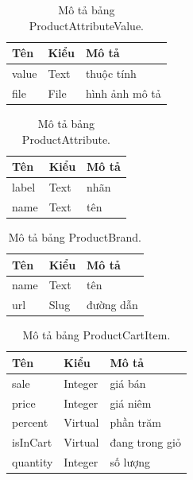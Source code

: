 \documentclass[11pt]{report}
\begin{document}
	
	\begin{table}[h!]
		\begin{center}
			\caption{Mô tả bảng ProductAttributeValue.}
			\begin{tabular}{ |l|l|l| } 
				\hline
				Tên & Kiểu & Mô tả \\
				\hline
				value & Text & thuộc tính \\
				file & File & hình ảnh mô tả \\ 
				\hline
			\end{tabular}
			\label{table:ProductAttributeValue}
		\end{center}
	\end{table}
	
	
	\begin{table}[h!]
		\begin{center}
			\caption{Mô tả bảng ProductAttribute.}
			\begin{tabular}{ |l|l|l| } 
				\hline
				Tên & Kiểu & Mô tả \\
				\hline
				label & Text & nhãn \\
				name & Text & tên \\
				\hline
			\end{tabular}
			\label{table:ProductAttribute}
		\end{center}
	\end{table}
	
	
	\begin{table}[h!]
		\begin{center}
			\caption{Mô tả bảng ProductBrand.}
			\begin{tabular}{ |l|l|l| } 
				\hline
				Tên & Kiểu & Mô tả \\
				\hline
				name & Text & tên \\
				url & Slug & đường dẫn \\
				\hline
			\end{tabular}
			\label{table:ProductBrand}
		\end{center}
	\end{table}
	
	
	\begin{table}[h!]
		\begin{center}
			\caption{Mô tả bảng ProductCartItem.}
			\begin{tabular}{ |l|l|l| } 
				\hline
				Tên & Kiểu & Mô tả \\
				\hline
				sale & Integer & giá bán \\
				price & Integer & giá niêm \\
				percent & Virtual & phần trăm \\
				isInCart & Virtual & đang trong giỏ \\
				quantity & Integer & số lượng \\ 
				\hline
			\end{tabular}
			\label{table:ProductCartItem}
		\end{center}
	\end{table}
	
\end{document}
